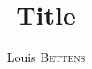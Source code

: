 \documentclass[11pt,a4paper]{paper}
\title{Title}
\author{Louis \textsc{Bettens}}
\begin{document}
\maketitle{}
\end{document}
